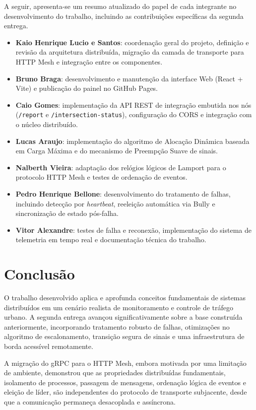 \documentclass[12pt]{article}
\begin{document}
A seguir, apresenta-se um resumo atualizado do papel de cada integrante no desenvolvimento do trabalho, incluindo as contribuições específicas da segunda entrega.

\begin{itemize}
    \item \textbf{Kaio Henrique Lucio e Santos}: coordenação geral do projeto, definição e revisão da arquitetura distribuída, migração da camada de transporte para HTTP Mesh e integração entre os componentes.
    \item \textbf{Bruno Braga}: desenvolvimento e manutenção da interface Web (React + Vite) e publicação do painel no GitHub Pages.
    \item \textbf{Caio Gomes}: implementação da API REST de integração embutida nos nós (\texttt{/report} e \texttt{/intersection-status}), configuração do CORS e integração com o núcleo distribuído.
    \item \textbf{Lucas Araujo}: implementação do algoritmo de Alocação Dinâmica baseada em Carga Máxima e do mecanismo de Preempção Suave de sinais.
    \item \textbf{Nalberth Vieira}: adaptação dos relógios lógicos de Lamport para o protocolo HTTP Mesh e testes de ordenação de eventos.
    \item \textbf{Pedro Henrique Bellone}: desenvolvimento do tratamento de falhas, incluindo detecção por \textit{heartbeat}, reeleição automática via Bully e sincronização de estado pós-falha.
    \item \textbf{Vitor Alexandre}: testes de falha e reconexão, implementação do sistema de telemetria em tempo real e documentação técnica do trabalho.
\end{itemize}

\section{Conclusão}

O trabalho desenvolvido aplica e aprofunda conceitos fundamentais de sistemas distribuídos em um cenário realista de monitoramento e controle de tráfego urbano. A segunda entrega avançou significativamente sobre a base construída anteriormente, incorporando tratamento robusto de falhas, otimizações no algoritmo de escalonamento, transição segura de sinais e uma infraestrutura de borda acessível remotamente.

A migração do gRPC para o HTTP Mesh, embora motivada por uma limitação de ambiente, demonstrou que as propriedades distribuídas fundamentais, isolamento de processos, passagem de mensagens, ordenação lógica de eventos e eleição de líder, são independentes do protocolo de transporte subjacente, desde que a comunicação permaneça desacoplada e assíncrona.
\end{document}
